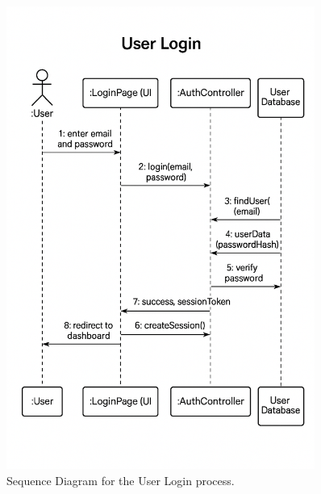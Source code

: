 \documentclass[11pt, a4paper]{article}
\begin{document}
\begin{figure}[h!]
    \centering
    \includegraphics[width=0.9\textwidth]{sequence-login.png}
    \caption{Sequence Diagram for the User Login process.}
    \label{fig:sequencelogin}
\end{figure}
\end{document}

